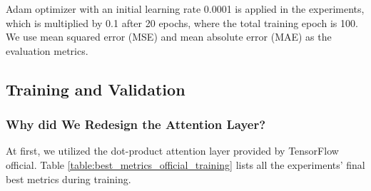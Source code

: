 \documentclass[
twocolumn,
]{ceurart}
\begin{document}
Adam\cite{kingma2017adam} optimizer with an initial learning rate 0.0001 is applied in the experiments, which is multiplied by 0.1 after 20 epochs, where the total training epoch is 100.
We use mean squared error (MSE) and mean absolute error (MAE) as the evaluation metrics.


\subsection{Training and Validation} %

\subsubsection{Why did We Redesign the Attention Layer?}

At first, we utilized the dot-product attention layer provided by TensorFlow official. Table \ref{table:best_metrics_official_training} lists all the experiments' final best metrics during training.
\end{document}
